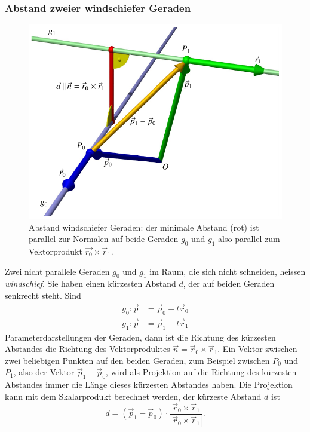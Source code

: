 \subsubsection{Abstand zweier windschiefer Geraden}
\begin{figure}
\begin{center}
\includegraphics{5/images/windschief.pdf}
\end{center}
\caption{Abstand windschiefer Geraden: der minimale Abstand (rot) ist
parallel zur Normalen auf beide Geraden $g_0$ und $g_1$ also parallel
zum Vektorprodukt $\vec{r_0}\times\vec{r}_1$.
\label{windschief}}
\end{figure}
Zwei nicht parallele Geraden $g_0$ und $g_1$ im Raum,
die sich nicht schneiden, heissen
{\em windschief}.
Sie haben
einen kürzesten Abstand $d$, der auf beiden Geraden senkrecht steht.
Sind
\begin{align*}
g_0:
\vec p&=\vec p_0+t\vec r_0\\
g_1:
\vec p&=\vec p_1+t\vec r_1
\end{align*}
Parameterdarstellungen der Geraden, dann ist die Richtung des kürzesten
Abstandes die Richtung des Vektorproduktes $\vec n = \vec r_0\times\vec r_1$.
Ein Vektor zwischen zwei beliebigen Punkten auf den beiden Geraden,
zum Beispiel zwischen $P_0$ und $P_1$, also der Vektor $\vec p_1-\vec p_0$,
wird als Projektion auf die Richtung des kürzesten Abstandes immer die
Länge dieses kürzesten Abstandes haben.
Die Projektion kann mit dem
Skalarprodukt berechnet werden, der kürzeste Abstand $d$ ist
\begin{equation}
d
=
(\vec p_1-\vec p_0)
\cdot
\frac{\vec r_0\times\vec r_1}{|\vec r_0\times\vec r_1|}.
\label{eqn:windschieferabstand}
\end{equation}


